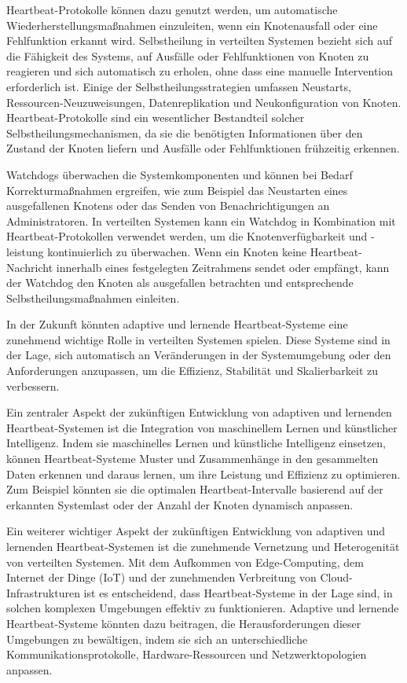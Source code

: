 Heartbeat-Protokolle können dazu genutzt werden, um automatische Wiederherstellungsmaßnahmen einzuleiten, wenn ein Knotenausfall oder eine Fehlfunktion erkannt wird. Selbstheilung in verteilten Systemen bezieht sich auf die Fähigkeit des Systems, auf Ausfälle oder Fehlfunktionen von Knoten zu reagieren und sich automatisch zu erholen, ohne dass eine manuelle Intervention erforderlich ist. Einige der Selbstheilungsstrategien umfassen Neustarts, Ressourcen-Neuzuweisungen, Datenreplikation und Neukonfiguration von Knoten. Heartbeat-Protokolle sind ein wesentlicher Bestandteil solcher Selbstheilungsmechanismen, da sie die benötigten Informationen über den Zustand der Knoten liefern und Ausfälle oder Fehlfunktionen frühzeitig erkennen.

Watchdogs überwachen die Systemkomponenten und können bei Bedarf Korrekturmaßnahmen ergreifen, wie zum Beispiel das Neustarten eines ausgefallenen Knotens oder das Senden von Benachrichtigungen an Administratoren. In verteilten Systemen kann ein Watchdog in Kombination mit Heartbeat-Protokollen verwendet werden, um die Knotenverfügbarkeit und -leistung kontinuierlich zu überwachen. Wenn ein Knoten keine Heartbeat-Nachricht innerhalb eines festgelegten Zeitrahmens sendet oder empfängt, kann der Watchdog den Knoten als ausgefallen betrachten und entsprechende Selbstheilungsmaßnahmen einleiten.

In der Zukunft könnten adaptive und lernende Heartbeat-Systeme eine zunehmend wichtige Rolle in verteilten Systemen spielen. Diese Systeme sind in der Lage, sich automatisch an Veränderungen in der Systemumgebung oder den Anforderungen anzupassen, um die Effizienz, Stabilität und Skalierbarkeit zu verbessern.

Ein zentraler Aspekt der zukünftigen Entwicklung von adaptiven und lernenden Heartbeat-Systemen ist die Integration von maschinellem Lernen und künstlicher Intelligenz. Indem sie maschinelles Lernen und künstliche Intelligenz einsetzen, können Heartbeat-Systeme Muster und Zusammenhänge in den gesammelten Daten erkennen und daraus lernen, um ihre Leistung und Effizienz zu optimieren. Zum Beispiel könnten sie die optimalen Heartbeat-Intervalle basierend auf der erkannten Systemlast oder der Anzahl der Knoten dynamisch anpassen.

Ein weiterer wichtiger Aspekt der zukünftigen Entwicklung von adaptiven und lernenden Heartbeat-Systemen ist die zunehmende Vernetzung und Heterogenität von verteilten Systemen. Mit dem Aufkommen von Edge-Computing, dem Internet der Dinge (IoT) und der zunehmenden Verbreitung von Cloud-Infrastrukturen ist es entscheidend, dass Heartbeat-Systeme in der Lage sind, in solchen komplexen Umgebungen effektiv zu funktionieren. Adaptive und lernende Heartbeat-Systeme könnten dazu beitragen, die Herausforderungen dieser Umgebungen zu bewältigen, indem sie sich an unterschiedliche Kommunikationsprotokolle, Hardware-Ressourcen und Netzwerktopologien anpassen.

